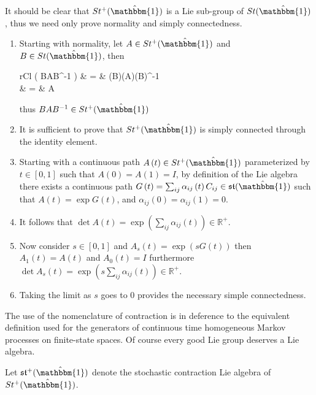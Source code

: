 \begin{IEEEproof}
	It should be clear that $St^{+}(\hat{\mathbbm{1}})$ is a Lie sub-group of $St(\hat{\mathbbm{1}})$,
	thus we need only prove normality and simply connectedness.
	\begin{enumerate}
		\item Starting with normality, let $A \in St^{+}(\hat{\mathbbm{1}})$ and $B \in St(\hat{\mathbbm{1}})$,
		then
		\begin{IEEEeqnarray*}{rCl}
			\det \left( BAB^{-1} \right)
				& = & \left(\det B\right)\left(\det A\right)\left(\det B\right)^{-1}\\
				& = & \det A
		\end{IEEEeqnarray*}
		thus $BAB^{-1} \in St^{+}(\hat{\mathbbm{1}})$
		\item It is sufficient to prove that $St^{+}(\hat{\mathbbm{1}})$ is simply connected
		through the identity element.
		\item Starting with a continuous path $A\left(t\right) \in St^{+}(\hat{\mathbbm{1}})$
		parameterized by $t \in \left[0,1\right]$ such that $A\left(0\right) = A\left(1\right) = I$,
		by definition of the Lie algebra there exists a continuous path $G\left(t \right) = \sum_{ij} \alpha_{ij}\left(t\right) C_{ij} \in \mathfrak{st}(\hat{\mathbbm{1}})$ 
		such that $A\left(t\right) = \exp G\left(t\right)$, and $\alpha_{ij}\left(0\right) = \alpha_{ij}\left(1\right) = 0$.
		\item It follows that $\det A\left(t\right) = \exp\left(\sum_{ij} \alpha_{ij}\left(t\right)\right) \in \mathbb{R}^{+}$.
		\item Now consider $s \in \left[0,1\right]$ and $A_s\left(t\right) = \exp\left(sG\left(t\right)\right)$
		then $A_1\left(t\right) = A\left(t\right)$ and $A_0\left(t\right) = I$
		furthermore $\det A_s\left(t\right) = \exp\left(s \sum_{ij} \alpha_{ij}\left(t\right)\right) \in \mathbb{R}^{+}$.
		\item Taking the limit as $s$ goes to $0$ provides the necessary simple 
		connectedness.\hfill\IEEEQEDhere
	\end{enumerate}
\end{IEEEproof}
The use of the nomenclature of contraction is in deference to the equivalent definition used
for the generators of continuous time homogeneous Markov processes on finite-state spaces.
Of course every good Lie group deserves a Lie algebra.
\begin{definition}
	Let $\mathfrak{st}^{+}(\hat{\mathbbm{1}})$ denote the stochastic contraction Lie 
	algebra of $St^{+}(\hat{\mathbbm{1}})$.
\end{definition}
